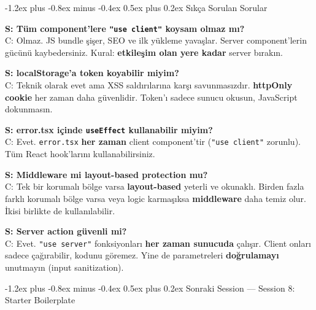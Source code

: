 \documentclass[12pt, a4paper]{article}
\makeatletter
\renewcommand{\subsection}{%
  \@startsection{subsection}{2}{\z@}%
    {-1.2ex plus -0.8ex minus -0.4ex}%
    {0.5ex plus 0.2ex}%
    {\normalfont\large\bfseries\sffamily\color{secondary}}%
}
\makeatother
\begin{document}
\subsection{Sıkça Sorulan Sorular}

\begin{warningbox}
\textbf{S: Tüm component'lere \texttt{"use client"} koysam olmaz mı?}\\
C: Olmaz. JS bundle şişer, SEO ve ilk yükleme yavaşlar. Server component'lerin
gücünü kaybedersiniz. Kural: \textbf{etkileşim olan yere kadar} server bırakın.

\vspace{6pt}
\textbf{S: localStorage'a token koyabilir miyim?}\\
C: Teknik olarak evet ama XSS saldırılarına karşı savunmasızdır.
\textbf{httpOnly cookie} her zaman daha güvenlidir. Token'ı sadece
sunucu okusun, JavaScript dokunmasın.

\vspace{6pt}
\textbf{S: error.tsx içinde \texttt{useEffect} kullanabilir miyim?}\\
C: Evet. \texttt{error.tsx} \textbf{her zaman} client component'tir
(\texttt{"use client"} zorunlu). Tüm React hook'larını kullanabilirsiniz.

\vspace{6pt}
\textbf{S: Middleware mi layout-based protection mu?}\\
C: Tek bir korumalı bölge varsa \textbf{layout-based} yeterli ve okunaklı.
Birden fazla farklı korumalı bölge varsa veya logic karmaşıksa
\textbf{middleware} daha temiz olur. İkisi birlikte de kullanılabilir.

\vspace{6pt}
\textbf{S: Server action güvenli mi?}\\
C: Evet. \texttt{"use server"} fonksiyonları \textbf{her zaman sunucuda}
çalışır. Client onları sadece çağırabilir, kodunu göremez. Yine de
parametreleri \textbf{doğrulamayı} unutmayın (input sanitization).
\end{warningbox}

\vspace{6pt}

\subsection{Sonraki Session --- Session 8: Starter Boilerplate}
\end{document}
